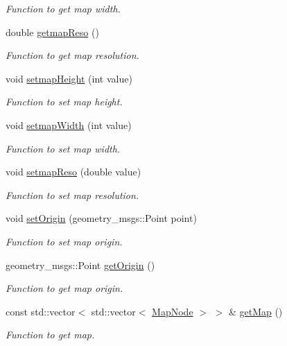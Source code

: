 \begin{DoxyCompactItemize}
\begin{DoxyCompactList}\small\item\em Function to get map width. \end{DoxyCompactList}\item 
double \hyperlink{classMap_a85211487535a00a6dd1cb003e2989238}{getmap\+Reso} ()
\begin{DoxyCompactList}\small\item\em Function to get map resolution. \end{DoxyCompactList}\item 
void \hyperlink{classMap_a0b24d829d0234c1422f89b873051a1a8}{setmap\+Height} (int value)
\begin{DoxyCompactList}\small\item\em Function to set map height. \end{DoxyCompactList}\item 
void \hyperlink{classMap_a9b2a2a242012e28deb30c323b42b8925}{setmap\+Width} (int value)
\begin{DoxyCompactList}\small\item\em Function to set map width. \end{DoxyCompactList}\item 
void \hyperlink{classMap_a65ddb9c03e089043bf819c1279a3f9f8}{setmap\+Reso} (double value)
\begin{DoxyCompactList}\small\item\em Function to set map resolution. \end{DoxyCompactList}\item 
void \hyperlink{classMap_a58b0c37d5d5e79dc1f23a0aa08536f6b}{set\+Origin} (geometry\+\_\+msgs\+::\+Point point)
\begin{DoxyCompactList}\small\item\em Function to set map origin. \end{DoxyCompactList}\item 
geometry\+\_\+msgs\+::\+Point \hyperlink{classMap_a471580c76f9da5202c5142bfb4ce6e2c}{get\+Origin} ()
\begin{DoxyCompactList}\small\item\em Function to get map origin. \end{DoxyCompactList}\item 
const std\+::vector$<$ std\+::vector$<$ \hyperlink{classMapNode}{Map\+Node} $>$ $>$ \& \hyperlink{classMap_ac7632edb702e1e9a62b3380e79a77825}{get\+Map} ()
\begin{DoxyCompactList}\small\item\em Function to get map. \end{DoxyCompactList}\item 

\end{DoxyCompactItemize}
